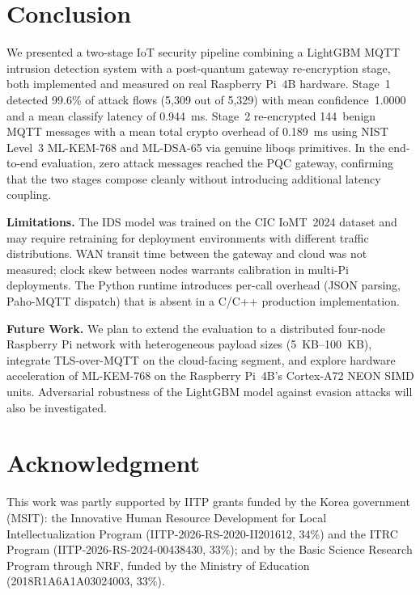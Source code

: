 \documentclass[conference]{IEEEtran}
\begin{document}
\section{Conclusion}

We presented a two-stage IoT security pipeline combining a LightGBM MQTT intrusion detection system with a post-quantum gateway re-encryption stage, both implemented and measured on real Raspberry Pi~4B hardware. Stage~1 detected 99.6\% of attack flows (5,309 out of 5,329) with mean confidence~1.0000 and a mean classify latency of 0.944~ms. Stage~2 re-encrypted 144~benign MQTT messages with a mean total crypto overhead of 0.189~ms using NIST Level~3 ML-KEM-768 and ML-DSA-65 via genuine liboqs primitives. In the end-to-end evaluation, zero attack messages reached the PQC gateway, confirming that the two stages compose cleanly without introducing additional latency coupling.

\textbf{Limitations.} The IDS model was trained on the CIC IoMT~2024 dataset and may require retraining for deployment environments with different traffic distributions. WAN transit time between the gateway and cloud was not measured; clock skew between nodes warrants calibration in multi-Pi deployments. The Python runtime introduces per-call overhead (JSON parsing, Paho-MQTT dispatch) that is absent in a C/C++ production implementation.

\textbf{Future Work.} We plan to extend the evaluation to a distributed four-node Raspberry Pi network with heterogeneous payload sizes (5~KB--100~KB), integrate TLS-over-MQTT on the cloud-facing segment, and explore hardware acceleration of ML-KEM-768 on the Raspberry Pi~4B's Cortex-A72 NEON SIMD units. Adversarial robustness of the LightGBM model against evasion attacks will also be investigated.

\section*{Acknowledgment}
This work was partly supported by IITP grants funded by the Korea government (MSIT): the Innovative Human Resource Development for Local Intellectualization Program (IITP-2026-RS-2020-II201612, 34\%) and the ITRC Program (IITP-2026-RS-2024-00438430, 33\%); and by the Basic Science Research Program through NRF, funded by the Ministry of Education (2018R1A6A1A03024003, 33\%).

\balance


\end{document}
